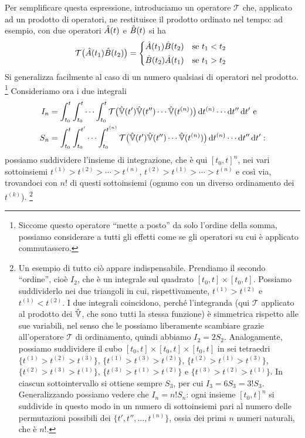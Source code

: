 Per semplificare questa espressione, introduciamo un operatore $\mathcal T$ che, applicato ad un prodotto di operatori, ne restituisce il prodotto ordinato nel tempo: ad esempio, con due operatori $\hat{A}(t)$ e $\hat{B}(t)$ si ha
\begin{equation}
	\mathcal T\big(\op A(t_1)\op B(t_2)\big)=
	\begin{cases*}
		\op A(t_1)\op B(t_2)	&se $t_1<t_2$\\
		\op B(t_2)\op A(t_1)	&se $t_1>t_2$
	\end{cases*}
	\label{eq:operatore-prodotto-ordinato-tempo}
\end{equation}
Si generalizza facilmente al caso di un numero qualsiasi di operatori nel prodotto.
\footnote{
	Siccome questo operatore ``mette a posto'' da solo l'ordine della somma, possiamo considerare a tutti gli effetti come se gli operatori su cui è applicato commutassero.
}
Consideriamo ora i due integrali
\begin{equation}
	\begin{aligned}
		I_n&=\int_{t_0}^t\int_{t_0}^t\cdots\int_{t_0}^t\mathcal T\big(\hat{\mathbb V}(t')\hat{\mathbb V}(t'')\cdots\hat{\mathbb V}(t^{(n)})\big)\,\textup{d} t^{(n)}\cdots\textup{d} t''\,\textup{d} t'\text{ e}\\
		S_n&=\int_{t_0}^t\int_{t_0}^{t'}\cdots\int_{t_0}^{t^{(n)}}\mathcal T\big(\hat{\mathbb V}(t')\hat{\mathbb V}(t'')\cdots\hat{\mathbb V}(t^{(n)})\big)\,\textup{d} t^{(n)}\cdots\textup{d} t''\,\textup{d} t':
	\end{aligned}
\end{equation}
possiamo suddividere l'insieme di integrazione, che è qui $[t_0,t]^n$, nei vari sottoinsiemi $t^{(1)}>t^{(2)}>\cdots>t^{(n)}$, $t^{(2)}>t^{(1)}>\cdots>t^{(n)}$ e cos\`i via, trovandoci con $n!$ di questi sottoinsiemi (ognuno con un diverso ordinamento dei $t^{(k)}$).
\footnote{
	Un esempio di tutto ciò appare indispensabile.
	Prendiamo il secondo ``ordine'', cioè $I_2$, che è un integrale sul quadrato $[t_0,t]\times[t_0,t]$.
	Possiamo suddividerlo nei due triangoli in cui, rispettivamente, $t^{(1)}>t^{(2)}$ e $t^{(1)}<t^{(2)}$.
	I due integrali coincidono, perch\'e l'integranda (qui $\mathcal T$ applicato al prodotto dei $\hat{\mathbb V}$, che sono tutti la stessa funzione) è simmetrica rispetto alle sue variabili, nel senso che le possiamo liberamente scambiare grazie all'operatore $\mathcal T$ di ordinamento, quindi abbiamo $I_2=2S_2$.
	Analogamente, possiamo suddividere il cubo $[t_0,t]\times[t_0,t]\times[t_0,t]$ in sei tetraedri $\{t^{(1)}>t^{(2)}>t^{(3)}\}$, $\{t^{(1)}>t^{(3)}>t^{(2)}\}$, $\{t^{(2)}>t^{(1)}>t^{(3)}\}$, $\{t^{(2)}>t^{(3)}>t^{(1)}\}$, $\{t^{(3)}>t^{(1)}>t^{(2)}\}$ e $\{t^{(3)}>t^{(2)}>t^{(1)}\}$.
	In ciascun sottointervallo si ottiene sempre $S_3$, per cui $I_3=6S_3=3!S_3$.
	Generalizzando possiamo vedere che $I_n=n!S_n$: ogni insieme $[t_0,t]^n$ si suddivide in questo modo in un numero di sottoinsiemi pari al numero delle permutazioni possibili dei $\{t',t'',\dots,t^{(n)}\}$, ossia dei primi $n$ numeri naturali, che è $n!$.
}
